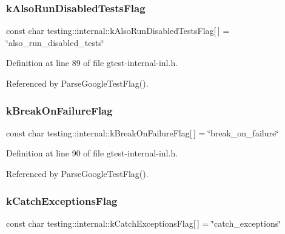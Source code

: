 \subsubsection{\texorpdfstring{k\+Also\+Run\+Disabled\+Tests\+Flag}{kAlsoRunDisabledTestsFlag}}
{\footnotesize\ttfamily const char testing\+::internal\+::k\+Also\+Run\+Disabled\+Tests\+Flag\mbox{[}$\,$\mbox{]} = \char`\"{}also\+\_\+run\+\_\+disabled\+\_\+tests\char`\"{}}



Definition at line 89 of file gtest-\/internal-\/inl.\+h.



Referenced by Parse\+Google\+Test\+Flag().

\mbox{\label{namespacetesting_1_1internal_a804c907155bfee3a6616ae3ca04048d0}} 
\subsubsection{\texorpdfstring{k\+Break\+On\+Failure\+Flag}{kBreakOnFailureFlag}}
{\footnotesize\ttfamily const char testing\+::internal\+::k\+Break\+On\+Failure\+Flag\mbox{[}$\,$\mbox{]} = \char`\"{}break\+\_\+on\+\_\+failure\char`\"{}}



Definition at line 90 of file gtest-\/internal-\/inl.\+h.



Referenced by Parse\+Google\+Test\+Flag().

\mbox{\label{namespacetesting_1_1internal_af4bb309802e83df0927097e6e4201a38}} 
\subsubsection{\texorpdfstring{k\+Catch\+Exceptions\+Flag}{kCatchExceptionsFlag}}
{\footnotesize\ttfamily const char testing\+::internal\+::k\+Catch\+Exceptions\+Flag\mbox{[}$\,$\mbox{]} = \char`\"{}catch\+\_\+exceptions\char`\"{}}



